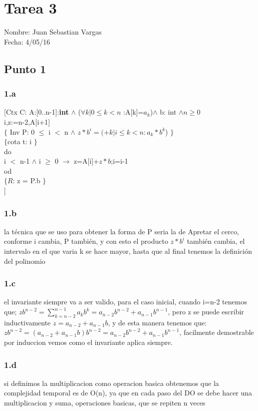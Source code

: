 \documentclass{article}
\newcommand\tab[1][1cm]{\hspace*{#1}}
\begin{document}
\section*{Tarea 3}
Nombre: Juan Sebastian Vargas\\
Fecha: 4/05/16

\subsection*{Punto 1}
\subsubsection*{1.a}
[Ctx C: A:[0..n-1]:\textbf{int} $\wedge$ ($\forall k | 0\leq k < n$ :A[k]=$a_k$)$\wedge$ b: int $\wedge n \geq 0$ \\
i,z:=n-2,A[i+1]\\
$\{$ Inv P: 0 $\leq$ i $<$ n $\wedge$ $z*b^i = (+k | i \leq k < n : a_k*b^k$) $\}$\\
$\{$cota t: i $\}$\\ 
do \\
\tab i $<$ n-1 $\wedge$ i $\geq$ 0 $\rightarrow$ z=A[i]+$z*b$;i=i-1\\
od\\
$\{R$: z = P.b $\}$\\
]
\subsubsection*{1.b}
la técnica que se uso para obtener la forma de P seria la de 
Apretar el cerco, conforme i cambia, P también, y con esto el producto $z*b^i$ también cambia, el intervalo en el que varia k se hace mayor, hasta que al final tenemos la definición del polinomio 
\subsubsection*{1.c}
el invariante siempre va a ser valido, para el caso inicial, cuando i=n-2 tenemos que;
$zb^{n-2}=\sum_{k=n-2}^{n-1} a_kb^k=a_{n-2}b^{n-2}+a_{n-1}b^{n-1}$, pero z se puede escribir inductivamente $z=a_{n-2}+a_{n-1}b$, y de esta manera tenemos que: 
$zb^{n-2}=(a_{n-2}+a_{n-1}b)b^{n-2}=a_{n-2}b^{n-2}+a_{n-1}b^{n-1}$, facilmente demostrable por induccion vemos como el invariante aplica siempre.
\subsubsection*{1.d}
si definimos la multiplicacion como operacion basica obtenemos que la complejidad temporal es de O(n), ya que en cada paso del DO se debe hacer una multiplicacion y suma, operaciones basicas, que se repiten n veces
\end{document}
